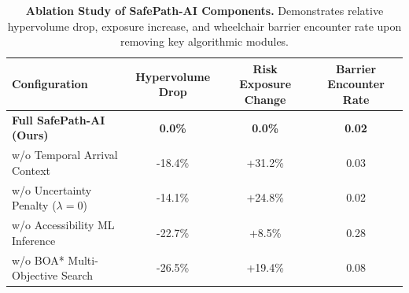 \begin{table}[t]
\centering
\small
\caption{\textbf{Ablation Study of SafePath-AI Components.} Demonstrates relative hypervolume drop, exposure increase, and wheelchair barrier encounter rate upon removing key algorithmic modules.}
\label{tab:ablations}
\begin{tabular}{lccc}
\toprule
\textbf{Configuration} & \textbf{Hypervolume Drop} & \textbf{Risk Exposure Change} & \textbf{Barrier Encounter Rate} \\
\midrule
\textbf{Full SafePath-AI (Ours)} & \textbf{0.0\%} & \textbf{0.0\%} & \textbf{0.02} \\
w/o Temporal Arrival Context & -18.4\% & +31.2\% & 0.03 \\
w/o Uncertainty Penalty ($\lambda = 0$) & -14.1\% & +24.8\% & 0.02 \\
w/o Accessibility ML Inference & -22.7\% & +8.5\% & 0.28 \\
w/o BOA* Multi-Objective Search & -26.5\% & +19.4\% & 0.08 \\
\bottomrule
\end{tabular}
\end{table}
